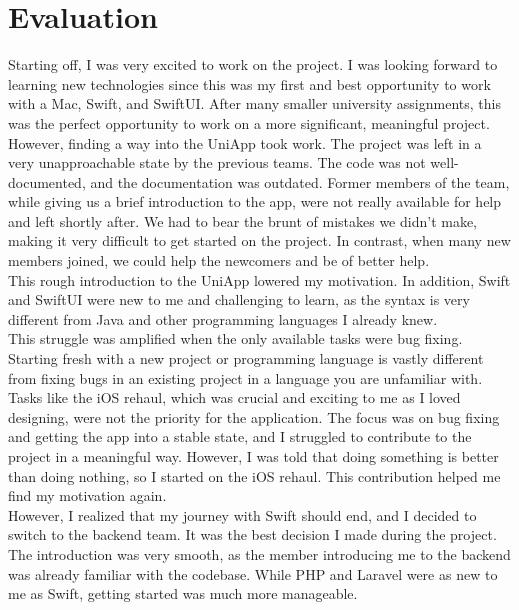 \documentclass[sf-font,usefira,english]{uulm/sp/article}
\begin{document}
\section{Evaluation}

Starting off, I was very excited to work on the project. 
I was looking forward to learning new technologies since this was my first and best opportunity to work with a Mac, Swift, and SwiftUI. 
After many smaller university assignments, this was the perfect opportunity to work on a more significant, meaningful project.\\

However, finding a way into the UniApp took work. 
The project was left in a very unapproachable state by the previous teams. 
The code was not well-documented, and the documentation was outdated. 
Former members of the team, while giving us a brief introduction to the app, were not really available for help and left shortly after. 
We had to bear the brunt of mistakes we didn't make, making it very difficult to get started on the project. 
In contrast, when many new members joined, we could help the newcomers and be of better help.\\

This rough introduction to the UniApp lowered my motivation.
In addition, Swift and SwiftUI were new to me and challenging to learn, as the syntax is very different from Java and other programming languages I already knew.\\
This struggle was amplified when the only available tasks were bug fixing. 
Starting fresh with a new project or programming language is vastly different from fixing bugs in an existing project in a language you are unfamiliar with. 
Tasks like the iOS rehaul, which was crucial and exciting to me as I loved designing, were not the priority for the application. 
The focus was on bug fixing and getting the app into a stable state, and I struggled to contribute to the project in a meaningful way. 
However, I was told that doing something is better than doing nothing, so I started on the iOS rehaul.
This contribution helped me find my motivation again.\\

However, I realized that my journey with Swift should end, and I decided to switch to the backend team. 
It was the best decision I made during the project. 
The introduction was very smooth, as the member introducing me to the backend was already familiar with the codebase. 
While PHP and Laravel were as new to me as Swift, getting started was much more manageable.\\
\end{document}
